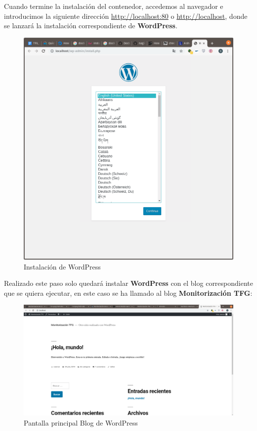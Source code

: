 Cuando termine la instalación del contenedor, accedemos al navegador e introducimos la siguiente dirección \url{http://localhost:80} o \url{http://localhost}, donde se lanzará la instalación correspondiente de \textbf{WordPress}.
\newpage
\begin{figure}[H]
	\centering
	\includegraphics[scale=0.2]{imagenes/wordpress/wordpressinstall.png}
	\caption{Instalación de WordPress} \label{wordpress}
\end{figure}

Realizado este paso solo quedará instalar \textbf{WordPress} con el blog correspondiente que se quiera ejecutar, en este caso se ha llamado al blog \textbf{Monitorización TFG}:

\begin{figure}[H]
	\centering
	\includegraphics[scale=0.2]{imagenes/wordpress/instalacion-wordpress.png}
	\caption{Pantalla principal Blog de WordPress} \label{wordpress}
\end{figure}
\newpage
